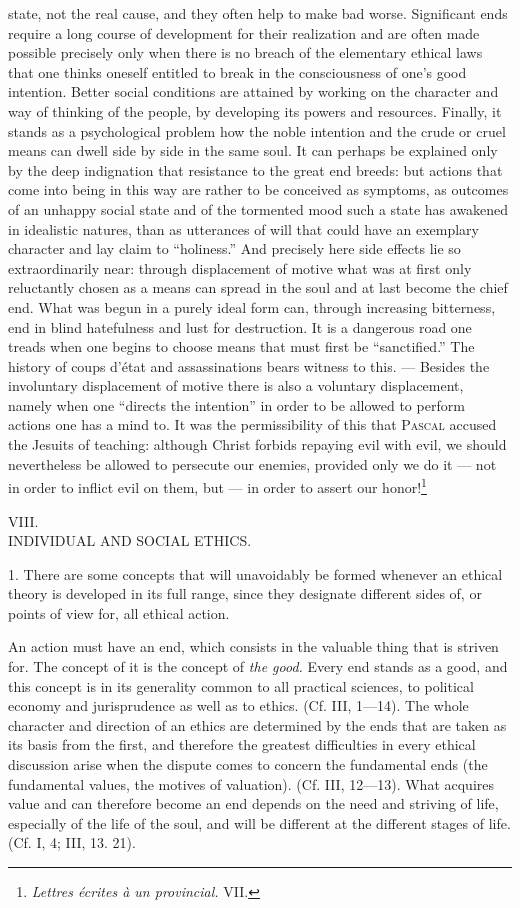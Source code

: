 \documentclass[12pt,a4paper,openany]{book}
\newcommand{\opage}[1]{\marginnote{\footnotesize\textit{[#1]}}}
\newcounter{etikch}
\newcommand{\chapterhead}[2]{\stepcounter{etikch}\bigskip\begin{center}\pdfbookmark[1]{#1 #2}{etikch.\arabic{etikch}}#1\\[3pt]{\large #2}\end{center}\medskip}
\begin{document}
state, not the real cause, and they often help to make bad worse. Significant ends require a long course of
development for their realization and are often made possible precisely only
\opage{154}when there is no breach of the elementary ethical laws that one thinks oneself entitled to break in the
consciousness of one's good intention. Better social conditions are attained by working on the character and
way of thinking of the people, by developing its powers and resources. Finally, it stands as a
psychological problem how the noble intention and the crude or cruel means can dwell side by side in the
same soul. It can perhaps be explained only by the deep indignation that resistance to the great end breeds:
but actions that come into being in this way are rather to be conceived as symptoms, as outcomes of an
unhappy social state and of the tormented mood such a state has awakened in idealistic natures, than as
utterances of will that could have an exemplary character and lay claim to ``holiness.'' And precisely here
side effects lie so extraordinarily near: through displacement of motive what was at first only reluctantly
chosen as a means can spread in the soul and at last become the chief end. What was begun in a purely ideal
form can, through increasing bitterness, end in blind hatefulness and lust for destruction. It is a
dangerous road one treads when one begins to choose means that must first be ``sanctified.'' The history of
coups d'état and assassinations bears witness to this. --- Besides the involuntary displacement of motive
there is also a voluntary displacement, namely when one ``directs the intention'' in order to be allowed to
perform actions one has a mind to. It was the permissibility of this that \textsc{Pascal} accused the Jesuits
of teaching: although Christ forbids repaying evil with evil, we should nevertheless be allowed to persecute
our enemies, provided only we do it --- not in order to inflict evil on them, but --- in order to assert our
honor!\footnote[1]{\textit{Lettres écrites à un provincial.} VII.}

\opage{155}\chapterhead{VIII.}{INDIVIDUAL AND SOCIAL ETHICS.}

1. There are some concepts that will unavoidably be formed whenever an ethical theory is developed in its
full range, since they designate different sides of, or points of view for, all ethical action.

An action must have an end, which consists in the valuable thing that is striven for. The concept of it is
the concept of \textit{the good.} Every end stands as a good, and this concept is in its generality common
to all practical sciences, to political economy and jurisprudence as well as to ethics. (Cf. III,
1---14). The whole character and direction of an ethics are determined by the ends that are taken as its
basis from the first, and therefore the greatest difficulties in every ethical discussion arise when the
dispute comes to concern the fundamental ends (the fundamental values, the motives of valuation). (Cf.
III, 12---13). What acquires value and can therefore become an end depends on the need and striving of
life, especially of the life of the soul, and will be different at the different stages of life. (Cf. I,
4; III, 13. 21).
\end{document}

